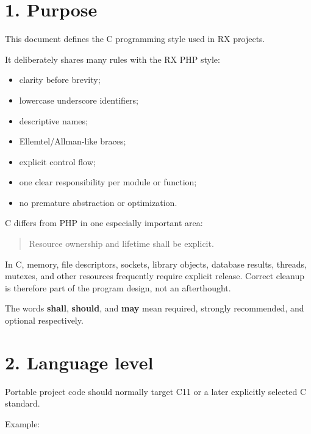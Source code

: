 \documentclass[11pt,a4paper]{article}
\begin{document}

\tableofcontents
\clearpage

\section{1. Purpose}\label{1-purpose}

This document defines the C programming style used in RX projects.

It deliberately shares many rules with the RX PHP style:

\begin{itemize}
\tightlist
\item
  clarity before brevity;
\item
  lowercase underscore identifiers;
\item
  descriptive names;
\item
  Ellemtel/Allman-like braces;
\item
  explicit control flow;
\item
  one clear responsibility per module or function;
\item
  no premature abstraction or optimization.
\end{itemize}

C differs from PHP in one especially important area:

\begin{quote}
Resource ownership and lifetime shall be explicit.
\end{quote}

In C, memory, file descriptors, sockets, library objects, database
results, threads, mutexes, and other resources frequently require
explicit release. Correct cleanup is therefore part of the program
design, not an afterthought.

The words \textbf{shall}, \textbf{should}, and \textbf{may} mean
required, strongly recommended, and optional respectively.

\section{2. Language level}\label{2-language-level}

Portable project code should normally target C11 or a later explicitly
selected C standard.

Example:
\end{document}
